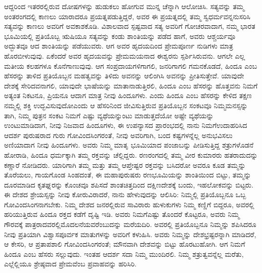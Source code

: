 ಆದ್ದರಿಂದ ಇತರರಲ್ಲಿರುವ ದೋಷಗಳನ್ನು ಹುಡುಕಲು ಹೋಗುವ ಮುನ್ನ ಚೆನ್ನಾಗಿ ಆಲೋಚಿಸಿ. ಸತ್ಯವನ್ನು ತಮ್ಮ ಅಂತರಂಗದಲ್ಲಿ ಕಾಣಲು ಯಾರಾದರೂ ಪ್ರಯತ್ನಪಡುತ್ತಿದ್ದರೆ, ಅವರ ಈ ಪ್ರಯತ್ನದಲ್ಲಿ ತಮ್ಮ ಸ್ವಧರ್ಮವನ್ನನುಸರಿಸಿ ಸತ್ಯವನ್ನು ಕಾಣಲು ಅವರಿಗೆ ಅವಕಾಶಕೊಡಿ. ವಿಶಾಲವಾದ ಸ್ಪಷ್ಟವಾದ ಸತ್ಯ ಅವರಿಗೆ ಗೋಚರವಾದಾಗ, ನಮ್ಮ ಭಾರತ ಭೂಮಿಯಲ್ಲಿ ಪ್ರತಿಯೊಬ್ಬ ಋಷಿಯೂ ಸತ್ಯವನ್ನು ಕಂಡು ಶಾಂತಿಯನ್ನು ಪಡೆದ ಹಾಗೆ, ಅವರು ಆಶ್ಚರ್ಯವೂ ಅದ್ಭುತವೂ ಆದ ಶಾಂತಿಯನ್ನು ಪಡೆಯುವರು. ಆಗ ಅವರ ಹೃದಯದಿಂದ ಪ್ರೇಮಪೂರ್ಣ ನುಡಿಗಳು ಮಾತ್ರ ಹೊರಬೀಳುವುವು. ಏಕೆಂದರೆ ಅವರ ಹೃದಯವನ್ನು ಪ್ರೇಮಮಯನಾದ ಈಶ್ವರನು ಸ್ಪರ್ಶಿಸಿರುವನು. ಆಗಲೇ ಎಲ್ಲ ಮತೀಯ ಕಲಹಗಳೂ ಕೊನೆಗಾಣುವುವು. ಆಗ ಸಂಪ್ರದಾಯಗಳಿಗಾಗಲಿ, ಜನರಿಗಾಗಲಿ ಗಮನಕೊಡದೆ, ಹಿಂದೂ ಎಂಬ ಹೆಸರನ್ನು ತಾಳಿದ ಪ್ರತಿಯೊಬ್ಬನ ಮಹತ್ವವನ್ನು ತಿಳಿದು ಅವನನ್ನು ಆಲಿಂಗಿಸಿ ಅವನನ್ನು ಪ್ರೀತಿಸುತ್ತೇವೆ. ಯಾವುದೇ ದೇಶಕ್ಕೆ ಸೇರಿದವನಾಗಲಿ, ಯಾವುದೇ ಭಾಷೆಯನ್ನು ಮಾತಾನಾಡುತ್ತಿರಲಿ, ಹಿಂದೂ ಎಂಬ ಹೆಸರನ್ನು ಹೊತ್ತವನು ನಿಮಗೆ ಅತ್ಯಂತ ನಿಕಟನೂ, ಪ್ರಿಯನೂ ಆದಾಗ ಮಾತ್ರ ನೀವು ಹಿಂದೂಗಳು. ಎಂದು ಹಿಂದೂ ಎಂಬ ಹೆಸರನ್ನು ಕೇಳಿದ ತಕ್ಷಣ ನಮ್ಮಲ್ಲಿ ಶಕ್ತಿ ಉದ್ಭವಿಸುವುದೋ\break ಎಂದು ಆ ಹೆಸರಿನಿಂದ ಜೀವಿಸುತ್ತಿರುವ ಪ್ರತಿಯೊಬ್ಬನ ಸಂಕಟವೂ ನಿಮ್ಮ\break ಮನಸ್ಸನ್ನು ತಾಗಿ, ನಿಮ್ಮ ಪುತ್ರನ ಸಂಕಟ ನಿಮಗೆ ಎಷ್ಟು ವ್ಯಥೆಯನ್ನುಂಟು ಮಾಡುತ್ತದೆಯೋ ಅಷ್ಟೇ ವ್ಯಥೆಯನ್ನು ಉಂಟುಮಾಡಿದಾಗ, ನೀವು ನಿಜ\break ವಾದ ಹಿಂದೂಗಳು, ಈ ಉಪನ್ಯಾಸದ ಪ್ರಾರಂಭದಲ್ಲಿ ನಾನು ನಿಮಗೆ\break ಉದಾಹರಿಸಿದ ಆದರ್ಶ ಪುರುಷರಾದ ಗುರು ಗೋವಿಂದಸಿಂಗರಂತೆ, ನೀವು ಅವರಿಗಾಗಿ, ಬಂದ ಕಷ್ಟಗಳನ್ನೆಲ್ಲ ಅನುಭವಿಸಲು ಅಣಿಯಾದಾಗ ನೀವು ಹಿಂದೂಗಳು. ಅವರು ನಿಮ್ಮ ಮಾತೃ ಭೂಮಿಯಾದ ಪಂಜಾಬನ್ನು ಪೀಡಿಸುತ್ತಿದ್ದ ಶತ್ರುಗಳೊಡನೆ ಹೋರಾಡಿ, ಹಿಂದೂ ಧರ್ಮಕ್ಕಾಗಿ ತಮ್ಮ ರಕ್ತವನ್ನು ಚೆಲ್ಲಿದ್ದರು. ರಣರಂಗದಲ್ಲಿ ತಮ್ಮ ವೀರ ಕುಮಾರರು ಹತರಾದುದನ್ನು ಕಣ್ಣಾರೆ ನೋಡಿದರು. ಯಾರಿಗಾಗಿ ತಮ್ಮ ಮತ್ತು ತಮ್ಮ ಆಪ್ತೇಷ್ಟರ ರಕ್ತವನ್ನು ಬಸಿದರೋ ಅವರೂ ಕೂಡ ತಮ್ಮನ್ನು ತೊರೆಯಲು, ಗಾಯಗೊಂಡ ಸಿಂಹದಂತೆ, ಈ ಮಹಾಪುರುಷರು ರಣಭೂಮಿಯನ್ನು ಶಾಂತಿಯಿಂದ ಬಿಟ್ಟು, ತಮ್ಮನ್ನು ದೂರಮಾಡಿದ ಕೃತಘ್ನರನ್ನು ಕೊಂಚವೂ ಶಪಿಸದೆ ಶಾಂತಚಿತ್ತದಿಂದ ದಕ್ಷಿಣದೇಶಕ್ಕೆ ಬಂದು, ಇಹಲೋಕವನ್ನು ಬಿಟ್ಟರು. ಈ ದೇಶದ ಶ್ರೇಯಸ್ಸನ್ನು ನೀವು ಕೋರುವಿರಾದರೆ, ನಾನು ಹೇಳುವುದನ್ನು ಆಲಿಸಿರಿ: ನಿಮ್ಮಲ್ಲಿ ಪ್ರತಿಯೊಬ್ಬನೂ ಒಬ್ಬ ಗೋವಿಂದಸಿಂಗನಾಗಬೇಕು. ನಿಮ್ಮ ದೇಶದ ಜನರಲ್ಲಿರುವ ಸಾವಿರಾರು ಹುಳುಕುಗಳು ನಿಮ್ಮ ಕಣ್ಣಿಗೆ ಬಿದ್ದರೂ, ಅವರಲ್ಲಿ ಹರಿಯುತ್ತಿರುವ ಹಿಂದೂ ರಕ್ತದ ಕಡೆಗೆ ದೃಷ್ಟಿ ಇಡಿ. ಅವರು ನಿಮಗೆ\break ಎಷ್ಟು ತೊಂದರೆ ಕೊಟ್ಟರೂ, ಅವರು ನಿಮ್ಮ ಗೌರವಕ್ಕೆ ಪಾತ್ರರಾದವರಲ್ಲಿ\break ಮೊದಲನೆಯವರೆಂಬುದನ್ನು ಮರೆಯದಿರಿ. ಅವರಲ್ಲಿ ಪ್ರತಿಯೊಬ್ಬನೂ ನಿಮ್ಮನ್ನು ಶಪಿಸಿದರೂ ನೀವು ಪ್ರತಿಯಾಗಿ ವಿಶ್ವಾಸಪೂರ್ವಕ ಮಾತುಗಳನ್ನು ಅವರಿಗೆ ಕಳುಹಿಸಿ. ಅವರು ನಿಮ್ಮನ್ನು ದೇಶಭ್ರಷ್ಟರನ್ನಾಗಿ ಮಾಡಿದರೆ, ಆ ಕೇಸರಿ, ಆ ಪ್ರತಾಪಶಾಲಿ ಗೋವಿಂದಸಿಂಗರಂತೆ; ಮೌನವಾಗಿ ದೇಶವನ್ನು ಬಿಟ್ಟು ಹೊರಟುಹೋಗಿ. ಆಗ ನಿಮಗೆ ಹಿಂದೂ ಎಂಬ ಹೆಸರು ಸಲ್ಲುವುದು. ಇಂತಹ ಆದರ್ಶ ಸದಾ ನಿಮ್ಮ ಮುಂದಿರಲಿ. ನಿಮ್ಮ ಶತ್ರುತ್ವವನ್ನೆಲ್ಲ ಮರೆತು, ಎಲ್ಲೆಲ್ಲಿಯೂ ಶ್ರೇಷ್ಠವಾದ ಪ್ರೇಮವೆಂಬ ಪ್ರವಾಹವನ್ನು ಹರಿಸಿರಿ.

